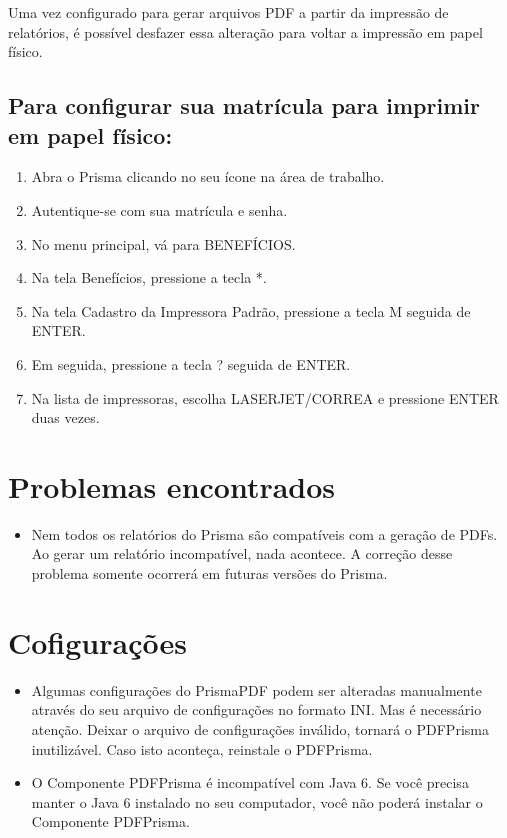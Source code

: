 \documentclass[12pt,a4paper]{article}
\begin{document}
\vspace{0.3cm}
\noindent Uma vez configurado para gerar arquivos PDF a partir da impressão de relatórios, é possível desfazer essa alteração para voltar a impressão em papel físico.

\subsection{Para configurar sua matrícula para imprimir em papel físico:}
\begin{enumerate}
  \item Abra o Prisma clicando no seu ícone na área de trabalho.
  \item Autentique-se com sua matrícula e senha.
  \item No menu principal, vá para BENEFÍCIOS.
  \item Na tela Benefícios, pressione a tecla *.
  \item Na tela Cadastro da Impressora Padrão, pressione a tecla M seguida de ENTER.
  \item Em seguida, pressione a tecla ? seguida de ENTER.
  \item Na lista de impressoras, escolha LASERJET/CORREA e pressione ENTER duas vezes.
\end{enumerate}

\section{Problemas encontrados}
\begin{itemize}
  \item Nem todos os relatórios do Prisma são compatíveis com a geração de PDFs. Ao gerar um relatório incompatível, nada acontece. A correção desse problema somente ocorrerá em futuras versões do Prisma.
\end{itemize}

\section{Cofigurações}

\begin{itemize}
  \item Algumas configurações do PrismaPDF podem ser alteradas manualmente através do seu arquivo de configurações no formato INI. Mas é necessário atenção. Deixar o arquivo de configurações inválido, tornará o PDFPrisma inutilizável. Caso isto aconteça, reinstale o PDFPrisma.
  \item O Componente PDFPrisma é incompatível com Java 6. Se você precisa manter o Java 6 instalado no seu computador, você não poderá instalar o Componente PDFPrisma.
\end{itemize}
\end{document}
